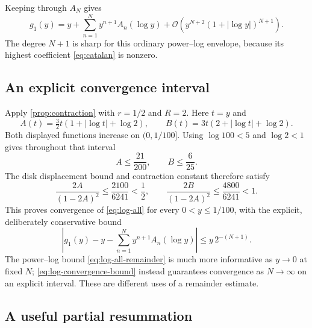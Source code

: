 \documentclass[11pt,a4paper]{article}
\numberwithin{equation}{section}
\theoremstyle{definition}\newtheorem{definition}[theorem]{Definition}
\theoremstyle{remark}\newtheorem{remark}[theorem]{Remark}
\newcommand{\OO}{\mathcal O}\newcommand{\dd}{\mathrm d}
\begin{document}
Keeping through $A_N$ gives
\begin{equation}
 g_1(y)=y+\sum_{n=1}^N y^{n+1}A_n(\log y)
 +\OO\!\left(y^{N+2}(1+|\log y|)^{N+1}\right).
 \label{eq:log-all-remainder}
\end{equation}
The degree $N+1$ is sharp for this ordinary power--log envelope, because
its highest coefficient \cref{eq:catalan} is nonzero.

\subsection{An explicit convergence interval}

Apply \cref{prop:contraction} with $r=1/2$ and $R=2$. Here $t=y$ and
\[
 A(t)=\tfrac32t(1+|\log t|+\log2),\qquad
 B(t)=3t(2+|\log t|+\log2).
\]
Both displayed functions increase on $(0,1/100]$. Using $\log100<5$ and
$\log2<1$ gives throughout that interval
\[
 A\le\frac{21}{200},\qquad B\le\frac6{25}.
\]
The disk displacement bound and contraction constant therefore satisfy
\[
 \frac{2A}{(1-2A)^2}\le\frac{2100}{6241}<\frac12,
 \qquad
 \frac{2B}{(1-2A)^2}\le\frac{4800}{6241}<1.
\]
This proves convergence of \cref{eq:log-all} for every
$0<y\le1/100$, with the explicit, deliberately conservative bound
\begin{equation}
 \left|g_1(y)-y-\sum_{n=1}^N y^{n+1}A_n(\log y)\right|
 \le y\,2^{-(N+1)}.
 \label{eq:log-convergence-bound}
\end{equation}
The power--log bound \cref{eq:log-all-remainder} is much more informative
as $y\to0$ at fixed $N$; \cref{eq:log-convergence-bound} instead guarantees
convergence as $N\to\infty$ on an explicit interval. These are different
uses of a remainder estimate.

\subsection{A useful partial resummation}
\end{document}
